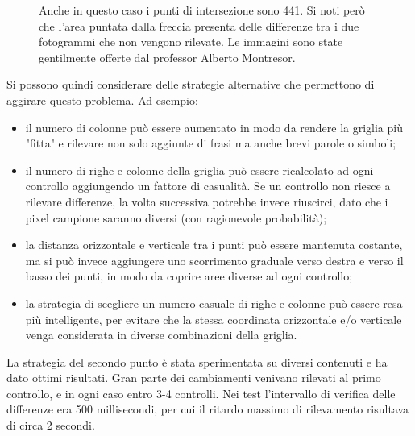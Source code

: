\begin{figure}[htbp]
\begin{subfigure}[t]{0.5\textwidth}
	\end{subfigure}
	
	\caption{Anche in questo caso i punti di intersezione sono 441. Si noti però che l'area puntata dalla freccia presenta delle differenze tra i due fotogrammi che non vengono rilevate. Le immagini sono state gentilmente offerte dal professor Alberto Montresor.}
	\label{fig:diff_slide2}
\end{figure}

Si possono quindi considerare delle strategie alternative che permettono di aggirare questo problema. Ad esempio:

\begin{itemize}
	\item il numero di colonne può essere aumentato in modo da rendere la griglia più "fitta" e rilevare non solo aggiunte di frasi ma anche brevi parole o simboli;
	\item il numero di righe e colonne della griglia può essere ricalcolato ad ogni controllo aggiungendo un fattore di casualità. Se un controllo non riesce a rilevare differenze, la volta successiva potrebbe invece riuscirci, dato che i pixel campione saranno diversi (con ragionevole probabilità);
	\item la distanza orizzontale e verticale tra i punti può essere mantenuta costante, ma si può invece aggiungere uno scorrimento graduale verso destra e verso il basso dei punti, in modo da coprire aree diverse ad ogni controllo;
	\item la strategia di scegliere un numero casuale di righe e colonne può essere resa più intelligente, per evitare che la stessa coordinata orizzontale e/o verticale venga considerata in diverse combinazioni della griglia.
\end{itemize}

La strategia del secondo punto è stata sperimentata su diversi contenuti e ha dato ottimi risultati. Gran parte dei cambiamenti venivano rilevati al primo controllo, e in ogni caso entro 3-4 controlli. Nei test l'intervallo di verifica delle differenze era 500 millisecondi, per cui il ritardo massimo di rilevamento risultava di circa 2 secondi.

